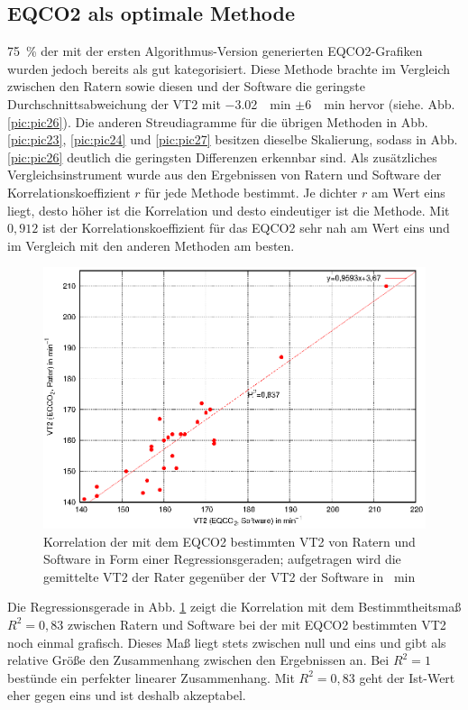 \subsection{\acrshort{EQCO2} als optimale Methode}
%
75~\% der mit der ersten Algorithmus-Version generierten \gls{EQCO2}-Grafiken wurden jedoch bereits als gut kategorisiert. Diese Methode brachte im Vergleich zwischen den Ratern sowie diesen und der Software die geringste Durchschnittsabweichung der VT2 mit \SI{-3,02}{\per\minute} $\pm$\SI{6}{\per\minute} hervor (siehe. Abb. \ref{pic:pic26}). Die anderen Streudiagramme für die übrigen Methoden in Abb. \ref{pic:pic23}, \ref{pic:pic24} und \ref{pic:pic27} besitzen dieselbe Skalierung, sodass in Abb. \ref{pic:pic26} deutlich die geringsten Differenzen erkennbar sind. Als zusätzliches Vergleichsinstrument wurde aus den Ergebnissen von Ratern und Software der Korrelationskoeffizient $r$ für jede Methode bestimmt. Je dichter $r$ am Wert eins liegt, desto höher ist die Korrelation und desto eindeutiger ist die Methode. Mit $0,912$ ist der Korrelationskoeffizient für das \gls{EQCO2} sehr nah am Wert eins und im Vergleich mit den anderen Methoden am besten.
%
\begin{figure}[H]
	\centering
	\includegraphics[scale=0.95]{Bilder/korr_eqco2.eps}
	\caption[Korrelation der \acrshort{EQCO2}-Werte von Ratern und Software]{Korrelation der mit dem \acrshort{EQCO2} bestimmten VT2 von Ratern und Software in Form einer Regressionsgeraden; aufgetragen wird die gemittelte VT2 der Rater gegenüber der VT2 der Software in \si{\per\minute}}
	\label{pic:pic28}
\end{figure}
%
Die Regressionsgerade in Abb. \ref{pic:pic28} zeigt die Korrelation mit dem Bestimmtheitsmaß $R^2 = 0,83$ zwischen Ratern und Software bei der mit \gls{EQCO2} bestimmten VT2 noch einmal grafisch. Dieses Maß liegt stets zwischen null und eins und gibt als relative Größe den Zusammenhang zwischen den Ergebnissen an. Bei $R^2 = 1$ bestünde ein perfekter linearer Zusammenhang. Mit $R^2 = 0,83$ geht der Ist-Wert eher gegen eins und ist deshalb akzeptabel.\\
